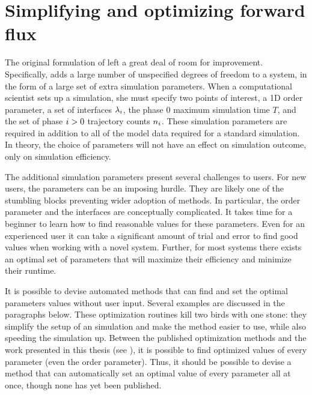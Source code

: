 
\section{Simplifying and optimizing forward flux}
The original formulation of \supercite{Allen:2005wy} left a great deal of room for improvement. Specifically,  adds a large number of unspecified degrees of freedom to a system, in the form of a large set of extra simulation parameters. When a computational scientist sets up a  simulation, she must specify two points of interest, a 1D order parameter, a set of interfaces ${\lambda}_{i}$, the phase $0$ maximum simulation time $T$, and the set of phase $i>0$ trajectory counts $n_{i}$. These simulation parameters are required in addition to all of the model data required for a standard  simulation. In theory, the choice of  parameters will not have an effect on simulation outcome\supercite{Allen:2009kb}, only on simulation efficiency.

The additional simulation parameters present several challenges to users. For new users, the  parameters can be an imposing hurdle. They are likely one of the stumbling blocks preventing wider adoption of  methods. In particular, the order parameter and the interfaces are conceptually complicated. It takes time for a beginner to learn how to find reasonable values for these parameters. Even for an experienced user it can take a significant amount of trial and error\supercite{Kratzer:2013fs} to find good values when working with a novel system. Further, for most systems there exists an optimal\supercite{Ma:2005jh} set of  parameters that will maximize their efficiency and minimize their runtime.

It is possible to devise automated methods that can find and set the optimal  parameters values without user input. Several examples are discussed in the paragraphs below. These optimization routines kill two birds with one stone: they simplify the setup of an  simulation and make the method easier to use, while also speeding the simulation up. Between the published optimization methods and the work presented in this thesis (see ), it is possible to find optimized values of every  parameter (even the order parameter\supercite{Borrero:2007eq}). Thus, it should be possible to devise a method that can automatically set an optimal value of every parameter all at once, though none has yet been published.%

